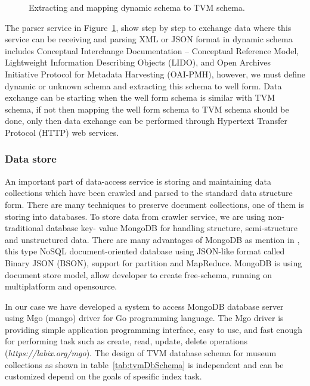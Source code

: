 \begin{figure}[ht]
	\caption{Extracting and mapping dynamic schema to TVM schema.}\label{fig:tvmMapping}
\end{figure}

The parser service in Figure~\cref{fig:tvmMapping}, show step by step to exchange data where this service can be receiving and parsing XML or JSON format in dynamic schema includes Conceptual Interchange Documentation -- Conceptual Reference Model, Lightweight Information Describing Objects (LIDO), and Open Archives Initiative Protocol for Metadata Harvesting (OAI-PMH), however, we must define dynamic or unknown schema and extracting this schema to well form. Data exchange can be starting when the well form schema is similar with TVM schema, if not then mapping the well form schema to TVM schema should be done, only then data exchange can be performed through Hypertext Transfer Protocol (HTTP) web services.

\subsubsection{Data store} An important part of data-access service is storing and maintaining data collections which have been crawled and parsed to the standard data structure form. There are many techniques to preserve document collections, one of them is storing into databases. To store data from crawler service, we are using non-traditional database key- value MongoDB for handling structure, semi-structure and unstructured data. There are many advantages of MongoDB as mention in \cite{StanescuBrezovanBurdescu,JiaZhaoWang,WuChenJiang}, this type NoSQL document-oriented database using JSON-like format called Binary JSON (BSON), support for partition and MapReduce. MongoDB is using document store model, allow developer to create free-schema, running on multiplatform and opensource.

In our case we have developed a system to access MongoDB database server using Mgo (mango) driver for Go programming language. The Mgo driver is providing simple application programming interface, easy to use, and fast enough for performing task such as create, read, update, delete operations (\textit{https://labix.org/mgo}). The design of TVM database schema for museum collections \cite{AnggaiBlekanovSergeev2015} as shown in table~\cref{tab:tvmDbSchema} is independent and can be customized depend on the goals of spesific index task.

